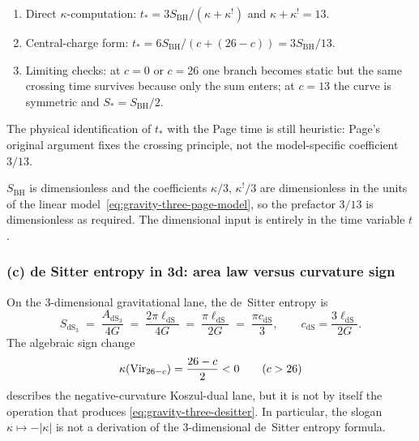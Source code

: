 \begin{remark}
\label{rem:gravity-three-page-verification}
\begin{enumerate}[label=\textup{(\Alph*)}]
\item Direct $\kappa$-computation:
$t_* = 3S_{\mathrm{BH}}/(\kappa+\kappa^!)$ and
$\kappa+\kappa^!=13$.
\item Central-charge form:
$t_* = 6S_{\mathrm{BH}}/(c+(26-c)) = 3S_{\mathrm{BH}}/13$.
\item Limiting checks:
at $c=0$ or $c=26$ one branch becomes static but the same crossing time
survives because only the sum enters; at $c=13$ the curve is symmetric
and $S_*=S_{\mathrm{BH}}/2$.
\end{enumerate}
The physical identification of $t_*$ with the Page time is still
heuristic: Page's original argument fixes the crossing principle, not
the model-specific coefficient $3/13$.
\end{remark}

\begin{remark}
\label{rem:gravity-three-page-dimensions}
$S_{\mathrm{BH}}$ is dimensionless and the coefficients
$\kappa/3$, $\kappa^!/3$ are dimensionless in the units of the linear
model~\eqref{eq:gravity-three-page-model}, so the prefactor $3/13$ is
dimensionless as required. The dimensional input is entirely in the
time variable $t$.
\end{remark}

\subsubsection*{(c) de Sitter entropy in 3d: area law versus curvature sign}

\begin{proposition}
\label{prop:gravity-three-desitter}
On the $3$-dimensional gravitational lane, the de~Sitter entropy is
\begin{equation}\label{eq:gravity-three-desitter}
S_{\mathrm{dS}_3}
\;=\;
\frac{A_{\mathrm{dS}_3}}{4G}
\;=\;
\frac{2\pi\ell_{\mathrm{dS}}}{4G}
\;=\;
\frac{\pi\ell_{\mathrm{dS}}}{2G}
\;=\;
\frac{\pi c_{\mathrm{dS}}}{3},
\qquad
c_{\mathrm{dS}}=\frac{3\ell_{\mathrm{dS}}}{2G}.
\end{equation}
The algebraic sign change
\[
\kappa(\mathrm{Vir}_{26-c})=\frac{26-c}{2}<0
\qquad (c>26)
\]
describes the negative-curvature Koszul-dual lane, but it is not by
itself the operation that produces
\eqref{eq:gravity-three-desitter}. In particular, the slogan
$\kappa \mapsto -|\kappa|$ is not a derivation of the
$3$-dimensional de~Sitter entropy formula.
\end{proposition}

